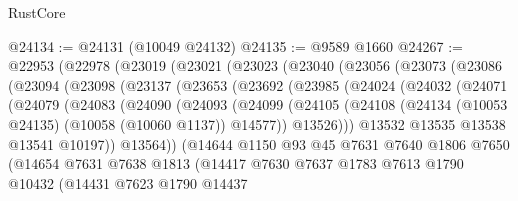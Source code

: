 \begin{lexlean}{RustCore}
\begin{coremodule}
@24134 := @24131 (@10049 @24132)
@24135 := @9589 @1660
@24267 := @22953
    (@22978
      (@23019
        (@23021
          (@23023
            (@23040
              (@23056
                (@23073
                  (@23086
                    (@23094
                      (@23098
                        (@23137
                          (@23653
                            (@23692
                              (@23985
                                (@24024
                                  (@24032
                                    (@24071
                                      (@24079
                                        (@24083
                                          (@24090
                                            (@24093
                                              (@24099
                                                (@24105
                                                  (@24108
                                                    (@24134
                                                      (@10053 @24135)
                                                      (@10058 (@10060 @1137))
                                                      @14577))
                                                  @13526)))
                                            @13532
                                            @13535
                                            @13538
                                            @13541
                                            @10197))
                                        @13564))
                                    (@14644
                                      @1150
                                      @93
                                      @45
                                      @7631
                                      @7640
                                      @1806
                                      @7650
                                      (@14654
                                        @7631
                                        @7638
                                        @1813
                                        (@14417
                                          @7630
                                          @7637
                                          @1783
                                          @7613
                                          @1790
                                          @10432
                                          (@14431
                                            @7623
                                            @1790
                                            @14437

\end{coremodule}
\end{lexlean}
